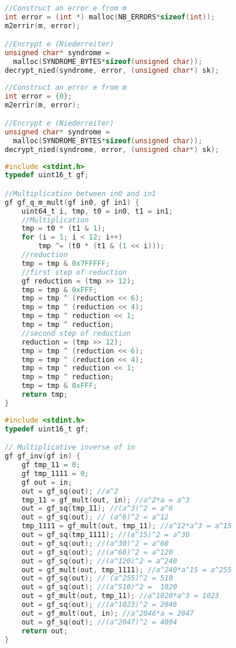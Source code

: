 
\begin{lstlisting}[caption={Code snippet of BIGQUAKE error attribution },label={lst:error_original},language=C]
//Construct an error e from m
int error = (int *) malloc(NB_ERRORS*sizeof(int));
m2errir(m, error);

//Encrypt e (Niederreiter)
unsigned char* syndrome = 
  malloc(SYNDROME_BYTES*sizeof(unsigned char));
decrypt_nied(syndrome, error, (unsigned char*) sk);
\end{lstlisting}

\begin{lstlisting}[caption={Code snippet of BIGQUAKE error attribution with the fix. },label={lst:error_fix},language=C]
//Construct an error e from m
int error = {0};
m2errir(m, error);

//Encrypt e (Niederreiter)
unsigned char* syndrome = 
  malloc(SYNDROME_BYTES*sizeof(unsigned char));
decrypt_nied(syndrome, error, (unsigned char*) sk);
\end{lstlisting}

\begin{lstlisting}[caption={Multiplication of two elements in $\mathbb{F}_{2^{12}}$ and inversion of an element in $\mathbb{F}_{2^{12}}$},label={lst:mult},language=C]
#include <stdint.h>
typedef uint16_t gf;

//Multiplication between in0 and in1
gf gf_q_m_mult(gf in0, gf in1) {
    uint64_t i, tmp, t0 = in0, t1 = in1;
    //Multiplication
    tmp = t0 * (t1 & 1);
    for (i = 1; i < 12; i++)
        tmp ^= (t0 * (t1 & (1 << i)));
    //reduction
    tmp = tmp & 0x7FFFFF;
    //first step of reduction
    gf reduction = (tmp >> 12);
    tmp = tmp & 0xFFF;
    tmp = tmp ^ (reduction << 6);
    tmp = tmp ^ (reduction << 4);
    tmp = tmp ^ reduction << 1;
    tmp = tmp ^ reduction;
    //second step of reduction
    reduction = (tmp >> 12);
    tmp = tmp ^ (reduction << 6);
    tmp = tmp ^ (reduction << 4);
    tmp = tmp ^ reduction << 1;
    tmp = tmp ^ reduction;
    tmp = tmp & 0xFFF;
    return tmp;
}
\end{lstlisting}

\begin{lstlisting}[caption={Inversion of an element in $\mathbb{F}_{2^{12}}$},label={lst:mult-inv},language=C]
#include <stdint.h>
typedef uint16_t gf;

// Multiplicative inverse of in
gf gf_inv(gf in) {
    gf tmp_11 = 0;
    gf tmp_1111 = 0;
    gf out = in;
    out = gf_sq(out); //a^2
    tmp_11 = gf_mult(out, in); //a^2*a = a^3
    out = gf_sq(tmp_11); //(a^3)^2 = a^6
    out = gf_sq(out); // (a^6)^2 = a^12
    tmp_1111 = gf_mult(out, tmp_11); //a^12*a^3 = a^15
    out = gf_sq(tmp_1111); //(a^15)^2 = a^30
    out = gf_sq(out); //(a^30)^2 = a^60
    out = gf_sq(out); //(a^60)^2 = a^120
    out = gf_sq(out); //(a^120)^2 = a^240
    out = gf_mult(out, tmp_1111); //a^240*a^15 = a^255
    out = gf_sq(out); // (a^255)^2 = 510
    out = gf_sq(out); //(a^510)^2 =  1020
    out = gf_mult(out, tmp_11); //a^1020*a^3 = 1023
    out = gf_sq(out); //(a^1023)^2 = 2046
    out = gf_mult(out, in); //a^2046*a = 2047
    out = gf_sq(out); //(a^2047)^2 = 4094
    return out;
}
\end{lstlisting}